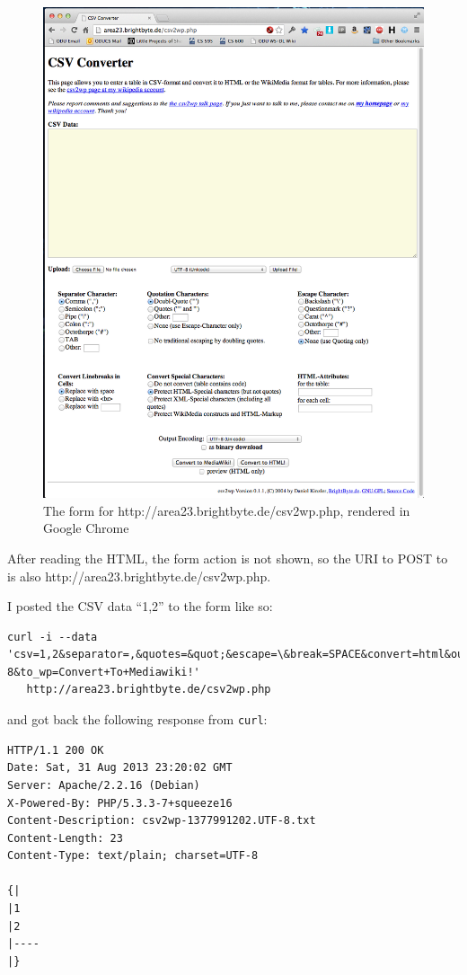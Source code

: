 \documentclass[letterpaper,11pt]{article}
\begin{document}
\begin{figure}
\includegraphics[scale=0.4]{work/q1screenie1.png}
\caption{The form for http://area23.brightbyte.de/csv2wp.php, rendered in Google Chrome}
\label{fig:q1screenie1}
\end{figure}

After reading the HTML, the form action is not shown, so the URI to POST to is also http://area23.brightbyte.de/csv2wp.php.

I posted the CSV data ``1,2'' to the form like so:
\begin{lstlisting}[frame=single]
curl -i --data 'csv=1,2&separator=,&quotes=&quot;&escape=\&break=SPACE&convert=html&output_encoding=UTF-8&to_wp=Convert+To+Mediawiki!'
   http://area23.brightbyte.de/csv2wp.php
\end{lstlisting}

and got back the following response from \verb+curl+:
\begin{lstlisting}[frame=single]
HTTP/1.1 200 OK
Date: Sat, 31 Aug 2013 23:20:02 GMT
Server: Apache/2.2.16 (Debian)
X-Powered-By: PHP/5.3.3-7+squeeze16
Content-Description: csv2wp-1377991202.UTF-8.txt
Content-Length: 23
Content-Type: text/plain; charset=UTF-8

{|
|1
|2
|----
|}
\end{lstlisting}
\end{document}
